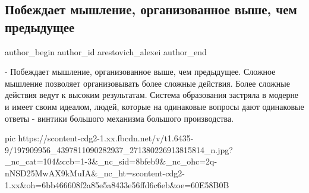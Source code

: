  
 
 
 
 
 
\subsection{Побеждает мышление, организованное выше, чем предыдущее}
\label{sec:07_06_2021.fb.arestovich_alexei.3.myshlenie_organizacia_pobeda}
\ifcmt
 author_begin
   author_id arestovich_alexei
 author_end
\fi

- Побеждает мышление, организованное выше, чем предыдущее. 
Сложное мышление позволяет организовывать более сложные действия. 
Более сложные действия ведут к высоким результатам.
Система образования застряла в модерне и имеет своим идеалом, людей, которые на одинаковые вопросы дают одинаковые ответы - винтики большого механизма большого производства.

\ifcmt
  pic https://scontent-cdg2-1.xx.fbcdn.net/v/t1.6435-9/197909956_4397811090282937_271380226913815814_n.jpg?_nc_cat=104&ccb=1-3&_nc_sid=8bfeb9&_nc_ohc=2q-nNSD25MwAX9kMuIA&_nc_ht=scontent-cdg2-1.xx&oh=6bb466608f2a85e5a8433e56ffd6c6eb&oe=60E58B0B
\fi

